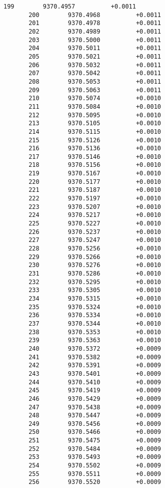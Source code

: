 \documentclass[11pt]{article}
\begin{document}
\begin{Verbatim}[commandchars=\\\{\}]
       199        9370.4957          +0.0011
       200        9370.4968          +0.0011
       201        9370.4978          +0.0011
       202        9370.4989          +0.0011
       203        9370.5000          +0.0011
       204        9370.5011          +0.0011
       205        9370.5021          +0.0011
       206        9370.5032          +0.0011
       207        9370.5042          +0.0011
       208        9370.5053          +0.0011
       209        9370.5063          +0.0011
       210        9370.5074          +0.0010
       211        9370.5084          +0.0010
       212        9370.5095          +0.0010
       213        9370.5105          +0.0010
       214        9370.5115          +0.0010
       215        9370.5126          +0.0010
       216        9370.5136          +0.0010
       217        9370.5146          +0.0010
       218        9370.5156          +0.0010
       219        9370.5167          +0.0010
       220        9370.5177          +0.0010
       221        9370.5187          +0.0010
       222        9370.5197          +0.0010
       223        9370.5207          +0.0010
       224        9370.5217          +0.0010
       225        9370.5227          +0.0010
       226        9370.5237          +0.0010
       227        9370.5247          +0.0010
       228        9370.5256          +0.0010
       229        9370.5266          +0.0010
       230        9370.5276          +0.0010
       231        9370.5286          +0.0010
       232        9370.5295          +0.0010
       233        9370.5305          +0.0010
       234        9370.5315          +0.0010
       235        9370.5324          +0.0010
       236        9370.5334          +0.0010
       237        9370.5344          +0.0010
       238        9370.5353          +0.0010
       239        9370.5363          +0.0010
       240        9370.5372          +0.0009
       241        9370.5382          +0.0009
       242        9370.5391          +0.0009
       243        9370.5401          +0.0009
       244        9370.5410          +0.0009
       245        9370.5419          +0.0009
       246        9370.5429          +0.0009
       247        9370.5438          +0.0009
       248        9370.5447          +0.0009
       249        9370.5456          +0.0009
       250        9370.5466          +0.0009
       251        9370.5475          +0.0009
       252        9370.5484          +0.0009
       253        9370.5493          +0.0009
       254        9370.5502          +0.0009
       255        9370.5511          +0.0009
       256        9370.5520          +0.0009

\end{Verbatim}
\end{document}
